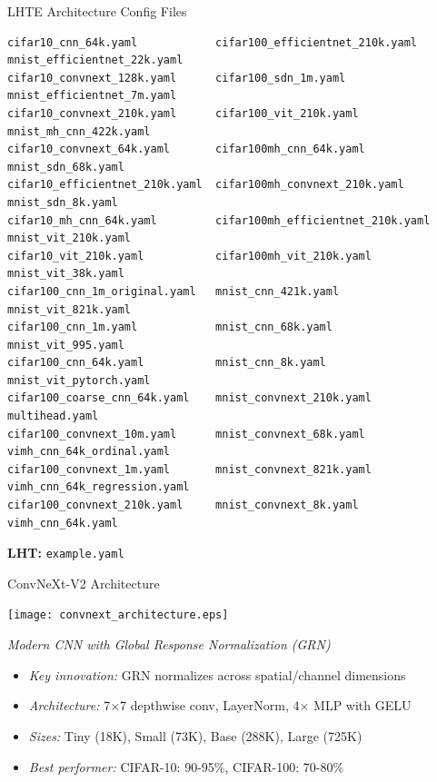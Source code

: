 \begin{wideslide}[\slideopts,toc={YAML},method=direct]{LHTE Architecture Config Files}
{\footnotesize
\begin{verbatim}
cifar10_cnn_64k.yaml            cifar100_efficientnet_210k.yaml    mnist_efficientnet_22k.yaml
cifar10_convnext_128k.yaml      cifar100_sdn_1m.yaml               mnist_efficientnet_7m.yaml
cifar10_convnext_210k.yaml      cifar100_vit_210k.yaml             mnist_mh_cnn_422k.yaml
cifar10_convnext_64k.yaml       cifar100mh_cnn_64k.yaml            mnist_sdn_68k.yaml
cifar10_efficientnet_210k.yaml  cifar100mh_convnext_210k.yaml      mnist_sdn_8k.yaml
cifar10_mh_cnn_64k.yaml         cifar100mh_efficientnet_210k.yaml  mnist_vit_210k.yaml
cifar10_vit_210k.yaml           cifar100mh_vit_210k.yaml           mnist_vit_38k.yaml
cifar100_cnn_1m_original.yaml   mnist_cnn_421k.yaml                mnist_vit_821k.yaml
cifar100_cnn_1m.yaml            mnist_cnn_68k.yaml                 mnist_vit_995.yaml
cifar100_cnn_64k.yaml           mnist_cnn_8k.yaml                  mnist_vit_pytorch.yaml
cifar100_coarse_cnn_64k.yaml    mnist_convnext_210k.yaml           multihead.yaml
cifar100_convnext_10m.yaml      mnist_convnext_68k.yaml            vimh_cnn_64k_ordinal.yaml
cifar100_convnext_1m.yaml       mnist_convnext_821k.yaml           vimh_cnn_64k_regression.yaml
cifar100_convnext_210k.yaml     mnist_convnext_8k.yaml             vimh_cnn_64k.yaml
\end{verbatim}
}
\textbf{LHT:} \; \texttt{example.yaml}
\end{wideslide}

\begin{slide}[\slideopts,toc={ConvNeXt}]{ConvNeXt-V2 Architecture}
  
  \centerline{\texttt{[image: convnext\_architecture.eps]}}

  \emph{Modern CNN with Global Response Normalization (GRN)}
  
  \begin{itemize}
    \item \emph{Key innovation:} GRN normalizes across spatial/channel dimensions
    
    \item \emph{Architecture:} 7×7 depthwise conv, LayerNorm, 4× MLP with GELU
    
    \item \emph{Sizes:} Tiny (18K), Small (73K), Base (288K), Large (725K)
    
    \item \emph{Best performer:} CIFAR-10: 90-95\%, CIFAR-100: 70-80\%
  \end{itemize}
  
\end{slide}

